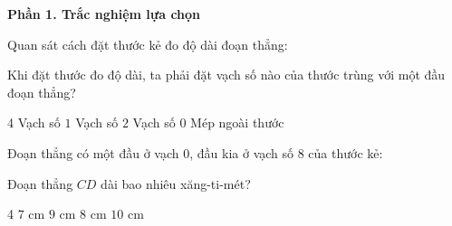 
\textbf{Phần 1. Trắc nghiệm lựa chọn}


\begin{ex} %
Quan sát cách đặt thước kẻ đo độ dài đoạn thẳng:
\begin{center}\vspace{-2.5mm}
\vspace{-2.5mm}\end{center}
Khi đặt thước đo độ dài, ta phải đặt vạch số nào của thước trùng với một đầu đoạn thẳng?
\begin{multicols}{4}
\choice
{Vạch số $1$}
{Vạch số $2$}
{\True Vạch số $0$}
{Mép ngoài thước}
\end{multicols}
\end{ex}

\begin{ex} %
Đoạn thẳng có một đầu ở vạch $0$, đầu kia ở vạch số $8$ của thước kẻ:
\begin{center}\vspace{-2.5mm}
\vspace{-2.5mm}\end{center}
Đoạn thẳng $CD$ dài bao nhiêu xăng-ti-mét?
\begin{multicols}{4}
\choice
{$7\text{ cm}$}
{$9\text{ cm}$}
{\True $8\text{ cm}$}
{$10\text{ cm}$}
\end{multicols}
\end{ex}

